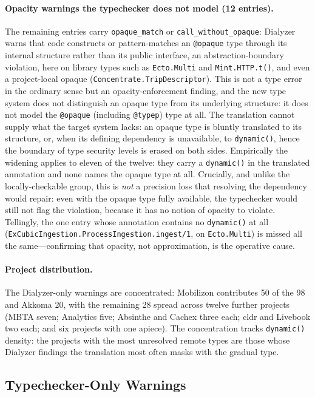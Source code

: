 \paragraph{Opacity warnings the typechecker does not model (12 entries).}
The remaining entries carry \texttt{opaque\_match} or \texttt{call\_without\_opaque}: Dialyzer warns that code constructs or pattern-matches an \texttt{@opaque} type through its internal structure rather than its public interface, an abstraction-boundary violation, here on library types such as \texttt{Ecto.Multi} and \texttt{Mint.HTTP.t()}, and even a project-local opaque (\texttt{Concentrate.TripDescriptor}).
This is not a type error in the ordinary sense but an opacity-enforcement finding, and the new type system does not distinguish an opaque type from its underlying structure: it does not model the \texttt{@opaque} (including \texttt{@typep}) type at all.
The translation cannot supply what the target system lacks: an opaque type is bluntly translated to its structure, or, when its defining dependency is unavailable, to \texttt{dynamic()}, hence the boundary of type security levels is erased on both sides.
Empirically the widening applies to eleven of the twelve: they carry a \texttt{dynamic()} in the translated annotation and none names the opaque type at all.
Crucially, and unlike the locally-checkable group, this is \emph{not} a precision loss that resolving the dependency would repair: even with the opaque type fully available, the typechecker would still not flag the violation, because it has no notion of opacity to violate.
Tellingly, the one entry whose annotation contains no \texttt{dynamic()} at all (\texttt{ExCubicIngestion.ProcessIngestion.ingest/1}, on \texttt{Ecto.Multi}) is missed all the same---confirming that opacity, not approximation, is the operative cause.

\paragraph{Project distribution.}
The Dialyzer-only warnings are concentrated: Mobilizon contributes 50 of the 98 and Akkoma 20, with the remaining 28 spread across twelve further projects (MBTA seven; Analytics five; Absinthe and Cachex three each; cldr and Livebook two each; and six projects with one apiece).
The concentration tracks \texttt{dynamic()} density: the projects with the most unresolved remote types are those whose Dialyzer findings the translation most often masks with the gradual type.

\subsection{Typechecker-Only Warnings}
\label{sec:typecheck-only}


